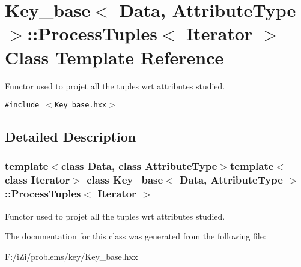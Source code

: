 \section{Key\_\-base$<$ Data, Attribute\-Type $>$::Process\-Tuples$<$ Iterator $>$ Class Template Reference}
\label{class_key__base_1_1_process_tuples}
Functor used to projet all the tuples wrt attributes studied.  


{\tt \#include $<$Key\_\-base.hxx$>$}



\subsection{Detailed Description}
\subsubsection*{template$<$class Data, class Attribute\-Type$>$template$<$class Iterator$>$ class Key\_\-base$<$ Data, Attribute\-Type $>$::Process\-Tuples$<$ Iterator $>$}

Functor used to projet all the tuples wrt attributes studied. 



The documentation for this class was generated from the following file:\begin{CompactItemize}
\item 
F:/i\-Zi/problems/key/Key\_\-base.hxx\end{CompactItemize}
